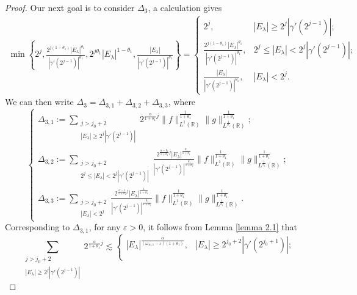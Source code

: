 \documentclass[11pt, twoside, leqno]{article}
\theoremstyle{definition}
\numberwithin{equation}{section}
\begin{document}
\begin{proof}
Our next goal is to consider $\Delta_{3}$, a calculation gives
\begin{align*}
\min\left\{2^j,\frac{2^{j(1-\theta_{1})}|E_\lambda|^{\theta_1}}{|\gamma'(2^{j-1})|^{\theta_{1}}},2^{j\theta_1} |E_\lambda|^{1-\theta_1},\frac{|E_\lambda|}{|\gamma'(2^{j-1})|^{\theta_1}}\right\}=
 \begin{cases}
   2^j, &  |E_\lambda|\geq2^j|\gamma'(2^{j-1})|; \\
   \frac{2^{j(1-\theta_{1})}|E_\lambda|^{\theta_1}}{|\gamma'(2^{j-1})|^{\theta_{1}}},&2^j\leq|E_\lambda|<2^j|\gamma'(2^{j-1})|;\\
  \frac{|E_\lambda|}{|\gamma'(2^{j-1})|^{\theta_1}} , & |E_\lambda|<2^j.
 \end{cases}
 \end{align*}
We can then write $\Delta_{3}=\Delta_{3,1}+\Delta_{3,2}+\Delta_{3,3}$, where
$$\begin{cases}
   \Delta_{3,1}:= \sum\limits_{  \substack{j>j_{0}+2   \\|E_\lambda|\geq2^j|\gamma'(2^{j-1})|  }}    2^{{\frac{\alpha}{1+\theta_{1}}}j}
\|f\|_{L^{1}(\mathbb{R})}^{\frac{1}{1+\theta_{1}}}\|g\|_{L^{\frac{1}{\theta_1}}(\mathbb{R})}^{\frac{1}{1+\theta_{1}}}; \\
   \Delta_{3,2}:=\sum\limits_{  \substack{j>j_{0}+2   \\2^j\leq|E_\lambda|<2^j|\gamma'(2^{j-1})|  }}   {\frac{2^{{\frac{\alpha-\theta_{1}}{1+\theta_{1}}}j}|E_\lambda|^{\frac{\theta_{1}}{1+\theta_{1}}}}{|\gamma'(2^{j-1})|^{\frac{\theta_{1}}{1+\theta_{1}}}}} \|f\|_{L^{1}(\mathbb{R})}^{\frac{1}{1+\theta_{1}}}\|g\|_{L^{\frac{1}{\theta_1}}(\mathbb{R})}^{\frac{1}{1+\theta_{1}}};\\
 \Delta_{3,3}:=\sum\limits_{  \substack{j>j_{0}+2   \\|E_\lambda|<2^j}}   {\frac{2^{{\frac{\alpha-1}{1+\theta_{1}}}j}|E_\lambda|^{\frac{1}{1+\theta_{1}}}}{|\gamma'(2^{j-1})|^{\frac{\theta_{1}}{1+\theta_{1}}}}}
 \|f\|_{L^{1}(\mathbb{R})}^{\frac{1}{1+\theta_{1}}}\|g\|_{L^{\frac{1}{\theta_1}}(\mathbb{R})}^{\frac{1}{1+\theta_{1}}}.
 \end{cases}$$
Corresponding to $\Delta_{3,1}$, for any $\varepsilon>0$, it follows from Lemma \ref{lemma 2.1} that
$$\sum\limits_{  \substack{j>j_{0}+2   \\|E_\lambda|\geq2^j|\gamma'(2^{j-1})|  }}    2^{{\frac{\alpha}{1+\theta_{1}}}j}\lesssim
\begin{cases}
   |E_\lambda|^{\frac{\alpha}{(\omega_{\infty,1}-\varepsilon)(1+\theta_{1})}}, & |E_\lambda|\geq2^{j_0+2}|\gamma'(2^{j_0+1})|; \\

\end{cases}$$
\end{proof}
\end{document}
